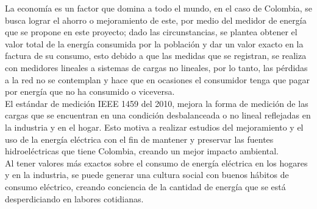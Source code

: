 La economía es un factor que domina a todo el mundo, en el caso de Colombia, se busca lograr el ahorro o mejoramiento de este, por medio del medidor de energía que se propone en este proyecto; dado las circunstancias, se plantea obtener el valor total de la energía consumida por la población y dar un valor exacto en la factura de su consumo, esto debido a que las medidas que se registran, se realiza con medidores lineales a sistemas de cargas no lineales, por lo tanto, las pérdidas a la red no se contemplan y hace que en ocasiones el consumidor tenga que pagar por energía que no ha consumido o viceversa.\\

El estándar de medición IEEE 1459 del 2010, mejora la forma de medición de las cargas que se encuentran en una condición desbalanceada o no lineal reflejadas en la industria y en el hogar. Esto motiva a realizar estudios del mejoramiento y el uso de la energía eléctrica con el fin de mantener y preservar las fuentes hidroeléctricas que tiene Colombia, creando un mejor impacto ambiental.\\

Al tener valores más exactos sobre el consumo de energía eléctrica en los hogares y en la industria, se puede generar una cultura social con buenos hábitos de consumo eléctrico, creando conciencia de la cantidad de energía que se está desperdiciando en labores cotidianas.\\

